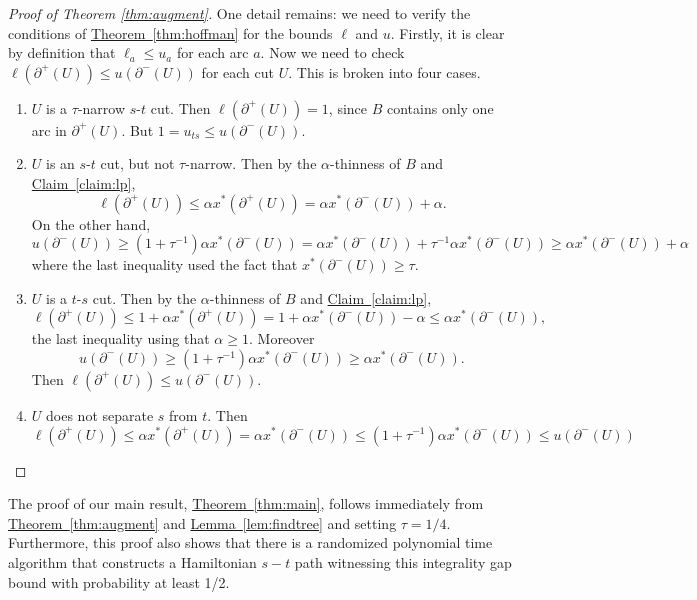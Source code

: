 \documentclass[11pt]{article}
\newcommand{\lref}[2][]{\hyperref[#2]{#1~\ref*{#2}}}
\theoremstyle{definition}
\def\A{{B}}
\begin{document}
\begin{proof}[Proof of Theorem \ref{thm:augment}]
One detail remains: we need to verify the conditions of
\lref[Theorem]{thm:hoffman} for the bounds $\ell$ and $u$.  Firstly, it is
clear by definition that $\ell_a \leq u_a$ for each arc $a$. Now we need
to check $\ell(\partial^+(U)) \leq u(\partial^-(U))$ for each cut
$U$. This is broken into four cases.

\begin{enumerate}
\item $U$ is a $\tau$-narrow $s$-$t$ cut. Then $\ell(\partial^+(U)) =
  1$, since $\A$ contains only one arc in $\partial^+(U)$. But $1 =
  u_{ts} \leq u(\partial^-(U))$.

\item $U$ is an $s$-$t$ cut, but not $\tau$-narrow. Then by the
  $\alpha$-thinness of $\A$ and \lref[Claim]{claim:lp},
  \[ \ell(\partial^+(U)) \leq \alpha x^*(\partial^+(U)) = \alpha
  x^*(\partial^-(U)) + \alpha. \] On the other hand,
  \[
  u(\partial^-(U)) \geq(1+\tau^{-1})\alpha x^*(\partial^-(U)) = \alpha
  x^*(\partial^-(U)) + \tau^{-1}\alpha x^*(\partial^-(U)) \geq \alpha
  x^*(\partial^-(U)) + \alpha
  \]
  where the last inequality used the fact that $x^*(\partial^-(U)) \geq \tau$.

\item $U$ is a $t$-$s$ cut. Then by the $\alpha$-thinness of $B$ and \lref[Claim]{claim:lp},
  \[ \ell(\partial^+(U)) \leq 1 + \alpha x^*(\partial^+(U)) = 1 + \alpha
  x^*(\partial^-(U)) - \alpha \leq \alpha x^*(\partial^-(U)), \]
  the last inequality using that $\alpha \geq 1$.  Moreover
  \[ u(\partial^-(U)) \geq (1+\tau^{-1})\alpha x^*(\partial^-(U)) \geq
  \alpha x^*(\partial^-(U)). \] Then $\ell(\partial^+(U)) \leq
  u(\partial^-(U))$.

\item $U$ does not separate $s$ from $t$. Then
  \[ \ell(\partial^+(U)) \leq \alpha x^*(\partial^+(U)) = \alpha
  x^*(\partial^-(U)) \leq (1+\tau^{-1})\alpha x^*(\partial^-(U)) \leq
  u(\partial^-(U)) \]
\end{enumerate}
\end{proof}

The proof of our main result, \lref[Theorem]{thm:main}, follows immediately from
\lref[Theorem]{thm:augment} and \lref[Lemma]{lem:findtree} and setting $\tau = 1/4$.
Furthermore, this proof also shows that there is a randomized polynomial time algorithm
that constructs a Hamiltonian $s-t$ path witnessing this integrality gap bound with probability at least 1/2.
\end{document}
